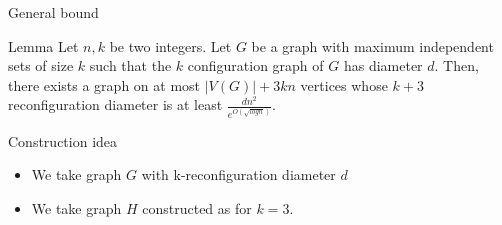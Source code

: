 \begin{frame}{General bound}
\begin{lemma}{Lemma}
    Let \(n,k\) be two integers. Let \(G\) be a graph with maximum independent sets of size \(k\) such that the \(k\) configuration graph of \(G\) has diameter \(d\). Then, there exists a graph on at most \(|V(G)|+3kn\) vertices whose \(k+3\) reconfiguration diameter is at least \(\frac{dn^2}{e^{O(\sqrt{log n})}}\).
\end{lemma}
\pause
\begin{heading}{Construction idea}
\begin{itemize}
    \item We take graph \(G\) with k-reconfiguration diameter \(d\)
    \item We take graph \(H\) constructed as for \(k=3\).
\end{itemize}
\end{heading}
\end{frame}
